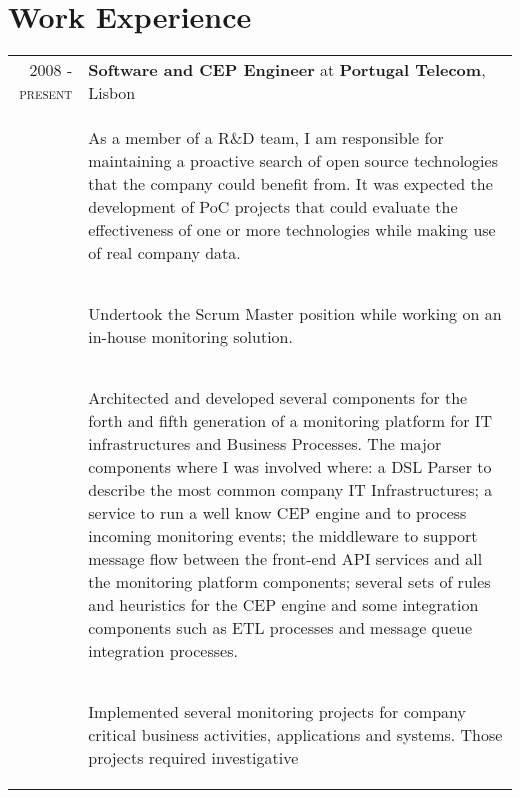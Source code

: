 \documentclass[a4paper,10pt]{article}
\begin{document}
\section{Work Experience}
\begin{tabular}{rp{11cm}}
  \textsc{2008 - present} & \textbf{Software and CEP Engineer} at \textbf{Portugal Telecom}, Lisbon\\ 
  & \begin{compactitem} 
     \item As a member of a R\&D team, I am responsible for maintaining a proactive
search of open source technologies that the company could benefit from.
It was expected the development of PoC projects that could evaluate
the effectiveness of one or more technologies while making use of real
company data.
     \end{compactitem}\vspace{-1em} \\
  & \begin{compactitem} 
     \item Undertook the Scrum Master position while working on an in-house monitoring solution.
     \end{compactitem}\vspace{-1em} \\
  & \begin{compactitem}
     \item Architected and developed several components for the forth and fifth generation of a monitoring platform for IT infrastructures and Business Processes. The major components where I was involved where: a DSL Parser to describe the most common company IT Infrastructures; a service to run a well know CEP engine and to process incoming monitoring events; the middleware to support message flow between the front-end API services and all the monitoring platform components; several sets of rules and heuristics for the CEP engine and some integration components such as ETL processes and message queue integration processes.
     \end{compactitem}\vspace{-1em} \\
  & \begin{compactitem} 
     \item 
     Implemented several monitoring projects for company critical business
activities, applications and systems. Those projects required investigative

\end{compactitem}
\end{tabular}
\end{document}
